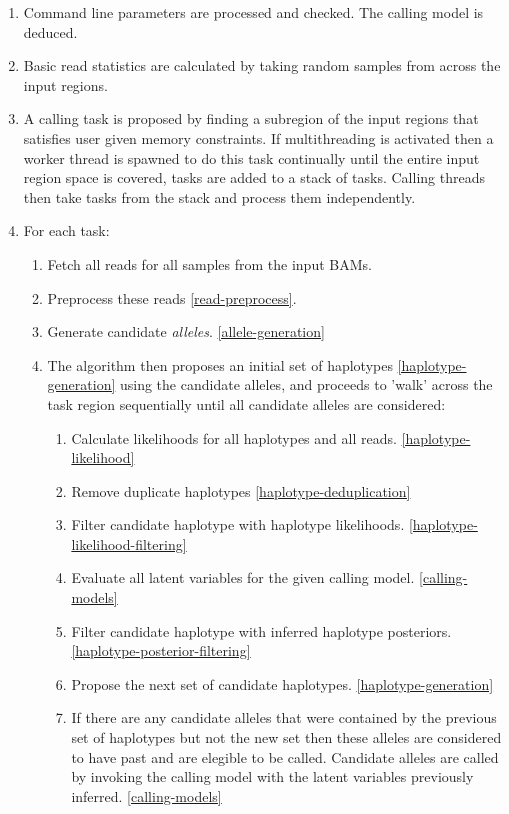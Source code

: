 \documentclass{article}
\begin{document}
\begin{enumerate}
	\item Command line parameters are processed and checked. The calling model is deduced.
	\item Basic read statistics are calculated by taking random samples from across the input regions.
	\item A calling task is proposed by finding a subregion of the input regions that satisfies user given memory constraints. If multithreading is activated then a worker thread is spawned to do this task continually until the entire input region space is covered, tasks are added to a stack of tasks. Calling threads then take tasks from the stack and process them independently.
	\item For each task:
	\begin{enumerate}
		\item Fetch all reads for all samples from the input BAMs.
		\item Preprocess these reads \ref{read-preprocess}.
		\item Generate candidate \emph{alleles}. \ref{allele-generation}
		\item The algorithm then proposes an initial set of haplotypes \ref{haplotype-generation} using the candidate alleles, and proceeds to 'walk' across the task region sequentially until all candidate alleles are considered:
		\begin{enumerate}
			\item Calculate likelihoods for all haplotypes and all reads. \ref{haplotype-likelihood}
			\item Remove duplicate haplotypes \ref{haplotype-deduplication}
			\item Filter candidate haplotype with haplotype likelihoods. \ref{haplotype-likelihood-filtering}
			\item Evaluate all latent variables for the given calling model. \ref{calling-models}
			\item Filter candidate haplotype with inferred haplotype posteriors. \ref{haplotype-posterior-filtering}
			\item Propose the next set of candidate haplotypes. \ref{haplotype-generation}
			\item If there are any candidate alleles that were contained by the previous set of haplotypes but not the new set then these alleles are considered to have past and are elegible to be called. Candidate alleles are called by invoking the calling model with the latent variables previously inferred. \ref{calling-models}

\end{enumerate}
\end{enumerate}
\end{enumerate}
\end{document}
